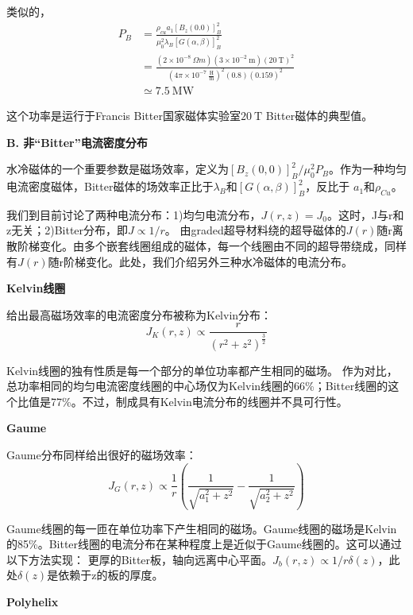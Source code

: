 类似的，
\begin{equation*}
\begin{split}
P_B&=\frac{\rho_{cu}a_1[B_z(0.0)]_B^2}{\mu_0^2\lambda_B[G(\alpha,\beta)]_B^2}\\
&=\frac{(2\times 10^{-8}\ \Omega m)(3\times 10^{-2}\ \mathrm{m})(20\ \mathrm{T})^2}{(4\pi\times 10^{-7}\ \mathrm{\frac{H}{m}})^2(0.8)(0.159)^2}\\
&\simeq 7.5\ \mathrm{MW}%
\end{split}
\end{equation*}

这个功率是运行于Francis Bitter国家磁体实验室$20\ \mathrm{T}$ Bitter磁体的典型值。

\textbf{B. 非“Bitter”电流密度分布}

水冷磁体的一个重要参数是磁场效率，定义为$[B_z(0,0)]_B^2/\mu_0^2 P_B$。作为一种均匀电流密度磁体，Bitter磁体的场效率正比于$\lambda_B$和$[G(\alpha,\beta)]_B^2$，反比于
$a_1$和$\rho_{Cu}$。

我们到目前讨论了两种电流分布：1)均匀电流分布，$J(r,z)=J_0$。这时，J与r和z无关；2)Bitter分布，即$J\propto 1/r$。
由graded超导材料绕的超导磁体的$J(r)$随r离散阶梯变化。由多个嵌套线圈组成的磁体，每一个线圈由不同的超导带绕成，同样有$J(r)$随r阶梯变化。此处，我们介绍另外三种水冷磁体的电流分布。

\textbf{Kelvin线圈}

给出最高磁场效率的电流密度分布被称为Kelvin分布：
\begin{equation*}
J_K(r,z)\propto\frac{r}{(r^2+z^2)^\frac{3}{2}}%
\end{equation*}

Kelvin线圈的独有性质是每一个部分的单位功率都产生相同的磁场。
作为对比，总功率相同的均匀电流密度线圈的中心场仅为Kelvin线圈的66\%；Bitter线圈的这个比值是77\%。不过，制成具有Kelvin电流分布的线圈并不具可行性。

\textbf{Gaume}

Gaume分布同样给出很好的磁场效率：
\begin{equation*}
J_G(r,z)\propto\frac{1}{r}\left(\frac{1}{\sqrt{a_1^2+z^2}}-\frac{1}{\sqrt{a_2^2+z^2}}\right)%
\end{equation*}

Gaume线圈的每一匝在单位功率下产生相同的磁场。Gaume线圈的磁场是Kelvin的85\%。Bitter线圈的电流分布在某种程度上是近似于Gaume线圈的。这可以通过以下方法实现：
更厚的Bitter板，轴向远离中心平面。$J_b(r,z)\propto 1/r\delta(z)$，此处$\delta(z)$是依赖于z的板的厚度。

\textbf{Polyhelix}

